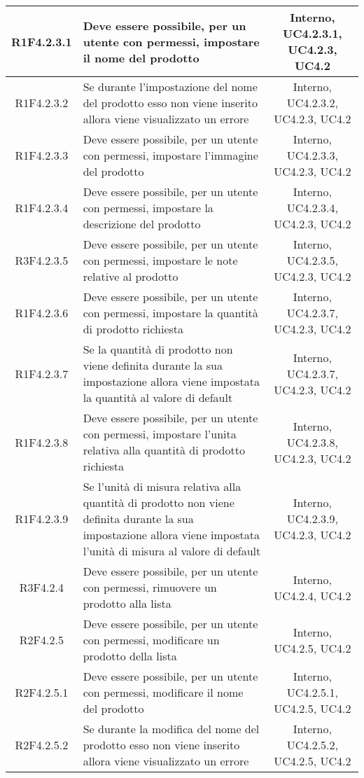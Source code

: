 \begin{longtable}{|c|>{\centering}m{7cm}|c|}
			\hline
			R1F4.2.3.1 & Deve essere possibile, per un utente con permessi, impostare il nome del prodotto & Interno, UC4.2.3.1, UC4.2.3, UC4.2 \\
			\hline
			R1F4.2.3.2 & Se durante l'impostazione del nome del prodotto esso non viene inserito allora viene visualizzato un errore & Interno, UC4.2.3.2, UC4.2.3, UC4.2 \\
			\hline
			R1F4.2.3.3 & Deve essere possibile, per un utente con permessi, impostare l'immagine del prodotto & Interno, UC4.2.3.3, UC4.2.3, UC4.2 \\
			\hline
			R1F4.2.3.4 & Deve essere possibile, per un utente con permessi, impostare la descrizione del prodotto & Interno, UC4.2.3.4, UC4.2.3, UC4.2 \\
			\hline
			R3F4.2.3.5 & Deve essere possibile, per un utente con permessi, impostare le note relative al prodotto & Interno, UC4.2.3.5, UC4.2.3, UC4.2 \\
			\hline
			R1F4.2.3.6 & Deve essere possibile, per un utente con permessi, impostare la quantità di prodotto richiesta & Interno, UC4.2.3.7, UC4.2.3, UC4.2 \\
			\hline
			R1F4.2.3.7 & Se la quantità di prodotto non viene definita durante la sua impostazione allora viene impostata la quantità al valore di default & Interno, UC4.2.3.7, UC4.2.3, UC4.2 \\
			\hline
			R1F4.2.3.8 & Deve essere possibile, per un utente con permessi, impostare l'unita relativa alla quantità di prodotto richiesta & Interno, UC4.2.3.8, UC4.2.3, UC4.2 \\
			\hline
			R1F4.2.3.9 & Se l'unità di misura relativa alla quantità di prodotto non viene definita durante la sua impostazione allora viene impostata l'unità di misura al valore di default & Interno, UC4.2.3.9, UC4.2.3, UC4.2 \\
			\hline
			R3F4.2.4 & Deve essere possibile, per un utente con permessi, rimuovere un prodotto alla lista & Interno, UC4.2.4, UC4.2 \\
			\hline
			R2F4.2.5 & Deve essere possibile, per un utente con permessi, modificare un prodotto della lista & Interno, UC4.2.5, UC4.2 \\
			\hline
			R2F4.2.5.1 & Deve essere possibile, per un utente con permessi, modificare il nome del prodotto & Interno, UC4.2.5.1, UC4.2.5, UC4.2 \\
			\hline
			R2F4.2.5.2 & Se durante la modifica del nome del prodotto esso non viene inserito allora viene visualizzato un errore & Interno, UC4.2.5.2, UC4.2.5, UC4.2 \\

\end{longtable}
